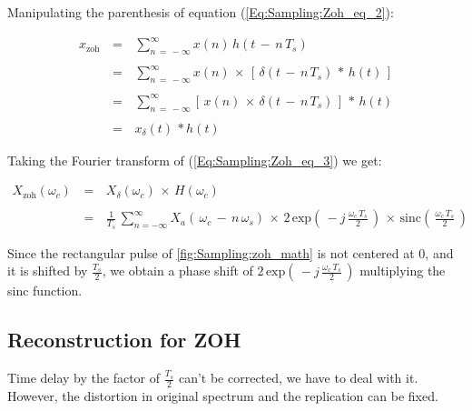Manipulating the parenthesis of equation (\ref{Eq:Sampling:Zoh_eq_2}):

\begin{equation}
\begin{array}{rcl}
x_{\text{zoh}} \, &=& \, \displaystyle\sum\limits_{n \, = \, -\infty}^{\infty} x(n) \, h\left(	t \, - \, n\,T_s \right) \\ \\		
&=& \, \displaystyle\sum\limits_{n \, = \, -\infty}^{\infty} x(n) \, \times \, \left[ \, \delta \left(	t \, - \, n\,T_s \right) \, * \, h(t) \, \right] \\ \\
&=& \, \displaystyle\sum\limits_{n \, = \, -\infty}^{\infty} \left[\, x(n) \, \times  \, \delta \left(	t \, - \, n\,T_s \right) \, \right] \, * \, h(t)   \\ \\
&=& \,  x_{\delta}(t) \, * h(t)
\end{array}
\label{Eq:Sampling:Zoh_eq_3}
\end{equation}


Taking the Fourier transform of (\ref{Eq:Sampling:Zoh_eq_3}) we get:

\begin{equation}
\begin{array}{rcl}
X_{\text{zoh}}(\omega_c) \, &=& \, X_{\delta}(\omega_c) \, \times \, H(\omega_c) \\ \\
			 &=& \, \displaystyle\frac{1}{T_s} \, \displaystyle\sum\limits_{n  =  -\infty}^{\infty} X_a \left( \, \omega_c \, - \,  n \, \omega_s \right) \, \times \, 2 \, \text{exp}\left( \, -j \, \displaystyle\frac{\omega_c \, T_s}{2} \, \right) \, \times \, \text{sinc}\left(\, \displaystyle\frac{\omega_c \, T_s}{2} \,\right) 
\end{array}
\end{equation}

Since the rectangular pulse of \autoref{fig:Sampling:zoh_math} is not centered at 0, and it is shifted by $\displaystyle\frac{T_s}{2}$, we obtain a phase shift of $ 2 \, \text{exp}\left( \, -j \, \displaystyle\frac{\omega_c \, T_s}{2} \, \right)$ multiplying the sinc function.


\subsection{Reconstruction for ZOH}


Time delay by the factor of  $\displaystyle\frac{T_s}{2}$ can't be corrected, we have to deal with it. However, the distortion in original spectrum and the replication can be fixed.\\

